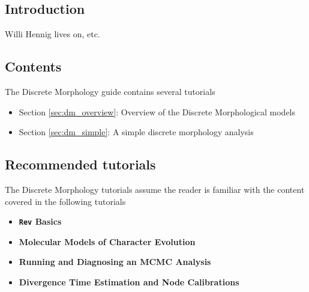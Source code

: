 \subsection*{Introduction}

Willi Hennig lives on, etc.

\subsection*{Contents}

The Discrete Morphology guide contains several tutorials

\begin{itemize}
\item Section \ref{sec:dm_overview}: Overview of the Discrete Morphological models
\item Section \ref{sec:dm_simple}: A simple discrete morphology analysis
\end{itemize}

\subsection*{Recommended tutorials}

The Discrete Morphology tutorials assume the reader is familiar with the content covered in the following \RevBayes tutorials

\begin{itemize}
\item {\bf {\tt \large Rev} Basics}
\item {\bf Molecular Models of Character Evolution}
\item {\bf Running and Diagnosing an MCMC Analysis}
\item {\bf Divergence Time Estimation and Node Calibrations}
\end{itemize}

\newpage

